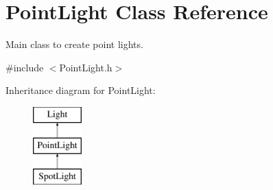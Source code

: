 \hypertarget{class_point_light}{}\section{Point\+Light Class Reference}
\label{class_point_light}


Main class to create point lights.  




{\ttfamily \#include $<$Point\+Light.\+h$>$}

Inheritance diagram for Point\+Light\+:\begin{figure}[H]
\begin{center}
\leavevmode
\includegraphics[height=3.000000cm]{class_point_light}
\end{center}
\end{figure}
